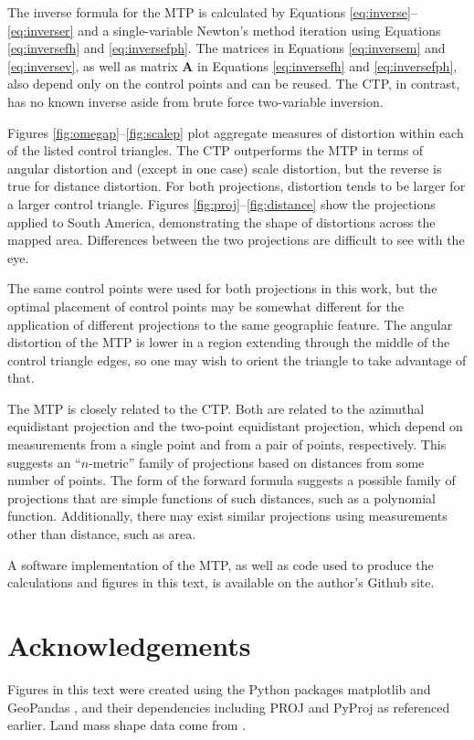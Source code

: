\documentclass[]{interact}
\begin{document}
The inverse formula for the MTP is calculated by Equations
\ref{eq:inverse}--\ref{eq:inverser} and a single-variable Newton's method
iteration using Equations \ref{eq:inversefh} and \ref{eq:inversefph}. The
matrices in Equations \ref{eq:inversem} and \ref{eq:inversev}, as well
as matrix $\mathbf A$ in Equations \ref{eq:inversefh} and \ref{eq:inversefph},
also depend only on the control points and can be reused. The CTP,
in contrast, has no known inverse aside from brute force two-variable inversion.

Figures \ref{fig:omegap}--\ref{fig:scalep} plot aggregate measures of distortion
within each of the listed control triangles. The CTP outperforms the MTP in
terms of angular distortion and (except in
one case) scale distortion, but the reverse is true for distance distortion. For
both projections, distortion tends to be larger for a larger control triangle.
Figures \ref{fig:proj}--\ref{fig:distance} show the projections applied to
South America, demonstrating the shape of distortions across the mapped area.
Differences between the two projections are difficult to see with the eye.

The same control points were used for both projections in this work, but the
optimal placement of control points may be somewhat different for the
application of different projections to the same geographic feature.
The angular distortion of the MTP is lower
in a region extending through the middle of the control triangle edges,
so one may wish to orient the triangle to take advantage of that.

The MTP is closely related to the CTP. Both are related to the azimuthal
equidistant projection and the two-point equidistant projection, which depend
on measurements from a single point and from a pair of points, respectively.
\citep{snyder87} This suggests an ``$n$-metric'' family of projections based on
distances from some number of points. The form of the forward formula suggests
a possible family of projections that are simple functions of such distances,
such as a polynomial function. Additionally, there may exist
similar projections using measurements other than distance, such as area.

A software implementation of the MTP, as well as code used to
produce the calculations and figures in this text,
is available on the author's Github site. \citep{trimetric}

\section{Acknowledgements}
Figures in this text were created using the Python packages matplotlib
\citep{matplotlib} and GeoPandas \citep{geopandas}, and their dependencies
including PROJ \citep{proj} and PyProj \citep{pyproj} as referenced earlier.
Land mass shape data come from \citet{natearth}.



\end{document}
